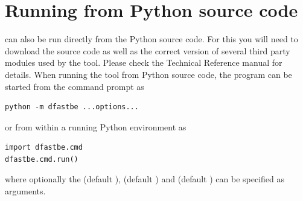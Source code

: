 \section{Running from Python source code} \label{Sec:Python}
\dfastbe can also be run directly from the Python source code.
For this you will need to download the source code as well as the correct version of several third party modules used by the tool.
Please check the \dfastbe Technical Reference manual for details.
When running the tool from Python source code, the program can be started from the command prompt as

\begin{Verbatim}
python -m dfastbe ...options...
\end{Verbatim}

or from within a running Python environment as

\begin{Verbatim}
import dfastbe.cmd
dfastbe.cmd.run()
\end{Verbatim}

where optionally the  (default ),  (default ) and  (default ) can be specified as arguments.